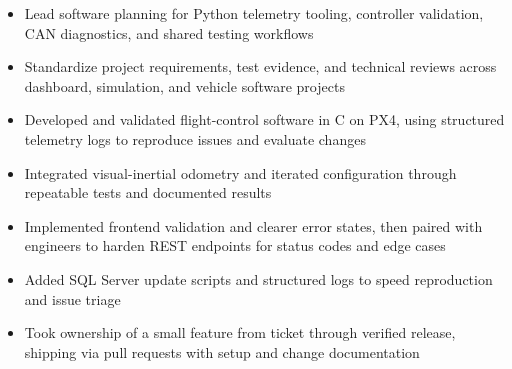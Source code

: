 \documentclass[10pt,letterpaper]{article}
\begin{document}
\bodyfont

\resumeheader
\educationsection




\orgline{\spartanracing}
\begin{itemize}
  \item Lead software planning for Python telemetry tooling, controller validation, CAN diagnostics, and shared testing workflows
  \item Standardize project requirements, test evidence, and technical reviews across dashboard, simulation, and vehicle software projects
\end{itemize}

\entryspace

\begin{itemize}
  \item Developed and validated flight-control software in C on PX4, using structured telemetry logs to reproduce issues and evaluate changes
  \item Integrated visual-inertial odometry and iterated configuration through repeatable tests and documented results
\end{itemize}

\entryspace

\begin{itemize}
  \item Implemented frontend validation and clearer error states, then paired with engineers to harden REST endpoints for status codes and edge cases
  \item Added SQL Server update scripts and structured logs to speed reproduction and issue triage
  \item Took ownership of a small feature from ticket through verified release, shipping via pull requests with setup and change documentation
\end{itemize}
\end{document}
